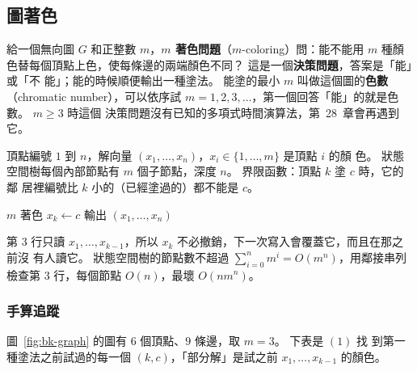 \subsection{圖著色}
\label{sec:bk-coloring}

給一個無向圖 $G$ 和正整數 $m$，\textbf{$m$ 著色問題}（$m$-coloring）問：能不能用 $m$ 種顏
色替每個頂點上色，使每條邊的兩端顏色不同？ 這是一個\textbf{決策問題}，答案是「能」或「不
能」；能的時候順便輸出一種塗法。 能塗的最小 $m$ 叫做這個圖的\textbf{色數}（chromatic
number），可以依序試 $m = 1, 2, 3, \ldots$，第一個回答「能」的就是色數。 $m \ge 3$ 時這個
決策問題沒有已知的多項式時間演算法，第~28~章會再遇到它。

頂點編號 $1$ 到 $n$，解向量 $(x_1, \ldots, x_n)$，$x_i \in \{1, \ldots, m\}$ 是頂點 $i$ 的顏
色。 狀態空間樹每個內部節點有 $m$ 個子節點，深度 $n$。 界限函數：頂點 $k$ 塗 $c$ 時，它的鄰
居裡編號比 $k$ 小的（已經塗過的）都不能是 $c$。

\begin{pseudo}[label=alg:bk-color]{$m$ 著色}
            \State $x_k \gets c$
                \State 輸出 $(x_1, \ldots, x_n)$
            \Else
                \State {}
            \EndIf
        \EndIf
    \EndFor
\EndProcedure
\end{pseudo}

第 3 行只讀 $x_1, \ldots, x_{k-1}$，所以 $x_k$ 不必撤銷，下一次寫入會覆蓋它，而且在那之前沒
有人讀它。 狀態空間樹的節點數不超過 $\sum_{i=0}^{n} m^i = O(m^n)$，用鄰接串列檢查第 3
行，每個節點 $O(n)$，最壞 $O(n m^n)$。

\subsubsection{手算追蹤}

圖~\ref{fig:bk-graph} 的圖有 $6$ 個頂點、$9$ 條邊，取 $m = 3$。 下表是 $(1)$ 找
到第一種塗法之前試過的每一個 $(k, c)$，「部分解」是試之前 $x_1, \ldots, x_{k-1}$ 的顏色。

\begin{center}
\label{fig:bk-graph}
\end{center}

